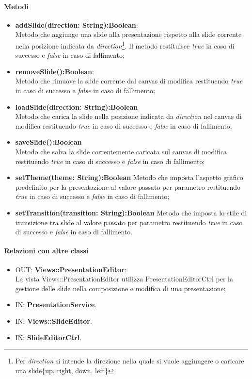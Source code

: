 	\paragraph{Metodi}
	\begin{itemize}
		\item \textbf{addSlide(direction: String):Boolean}:\\
			Metodo che aggiunge una slide alla presentazione rispetto alla slide corrente nella posizione indicata da \textit{direction}\footnote{Per \textit{direction} si intende la direzione nella quale si vuole aggiungere o caricare una slide\{up, right, down, left\}}. Il metodo restituisce \textit{true} in caso di successo e \textit{false} in caso di fallimento;
		\item \textbf{removeSlide():Boolean}:\\
			Metodo che rimuove la slide corrente dal canvas di modifica restituendo \textit{true} in caso di successo e \textit{false} in caso di fallimento;
		\item \textbf{loadSlide(direction: String):Boolean}\\
			Metodo che carica la slide nella posizione indicata da \textit{direction} nel canvas di modifica restituendo \textit{true} in caso di successo e \textit{false} in caso di fallimento;
		\item \textbf{saveSlide():Boolean}\\
			Metodo che salva la slide correntemente caricata sul canvas di modifica restituendo \textit{true} in caso di successo e \textit{false} in caso di fallimento;
		\item \textbf{setTheme(theme: String):Boolean}
			Metodo che imposta l'aspetto grafico predefinito per la presentazione al valore passato per parametro restituendo \textit{true} in caso di successo e \textit{false} in caso di fallimento;
		\item \textbf{setTransition(transition: String):Boolean}
			Metodo che imposta lo stile di transizione tra slide al valore passato per parametro restituendo \textit{true} in caso di successo e \textit{false} in caso di fallimento.
	\end{itemize}
	\paragraph{Relazioni con altre classi}
	\begin{itemize}
	  \item OUT: \textbf{Views::PresentationEditor}:\\
		La vista Views::PresentationEditor utilizza PresentationEditorCtrl per la gestione delle slide nella composizione e modifica di una presentazione;	
	  \item IN: \textbf{PresentationService}.
	  \item IN: \textbf{Views::SlideEditor}.
	  \item IN: \textbf{SlideEditorCtrl}.
	\end{itemize}  

